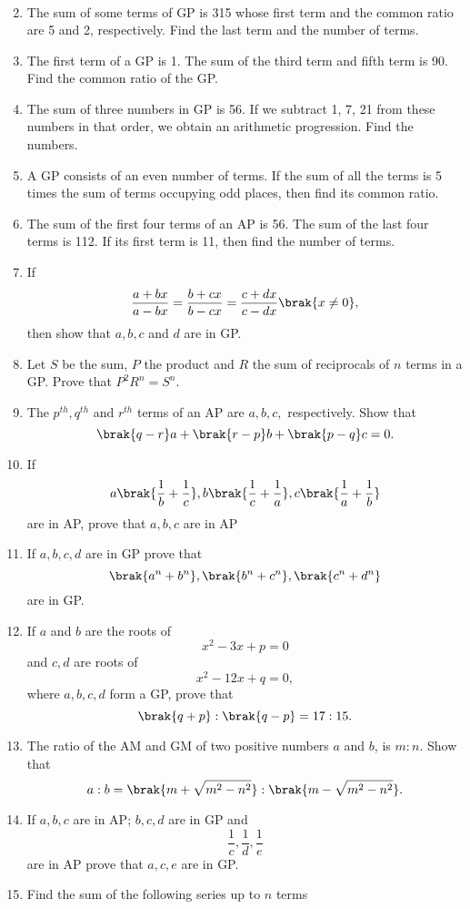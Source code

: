 \begin{enumerate}[label=\thesubsection.\arabic*.,ref=\thesubsection.\theenumi]
\begin{align}
\end{align}
\item The sum of some terms of GP  is 315 whose first term and the common ratio are 5 and 2, respectively. Find the last term and the number of terms.
\item  The first term of a GP  is 1. The sum of the third term and fifth term is 90. Find the common ratio of the GP.
\item The sum of three numbers in GP  is 56. If we subtract 1, 7, 21 from these numbers in that order, we obtain an arithmetic progression. Find the numbers.
\item A GP  consists of an even number of terms. If the sum of all the terms is 5 times the sum of terms occupying odd places, then find its common ratio.
\item  The sum of the first four terms of an AP  is 56. The sum of the last four terms is 112. If its first term is 11, then find the number of terms.
\item If $$\frac{a+bx}{a-bx} = \frac{b+cx}{b-cx} = \frac{c+dx}{c-dx}\brak{x \neq 0},$$ then show that $a, b, c$ and $d$ are in GP.
\item Let $S$ be the sum, $P$ the product and $R$ the sum of reciprocals of $n$ terms in a GP.  Prove that $P^2R^n = S^n.$ 
\item The $p^{th}, q^{th}$ and $r^{th}$ terms of an AP  are $a, b, c,$ respectively. Show that 
$$\brak{q - r }a + \brak{r - p }b + \brak{p - q }c = 0.$$
\item If $$a\brak{\frac{1}{b}+\frac{1}{c}}, b\brak{\frac{1}{c}+\frac{1}{a}}, c\brak{\frac{1}{a}+\frac{1}{b}}$$ are in AP, prove that $a, b, c$ are in AP 
\item If $a, b, c, d$ are in GP  prove that $$\brak{a^n + b^n}, \brak{b^n + c^n}, \brak{c^n + d^n}$$ are in GP. 
\item If $a$ and $b$ are the roots of $$x^2 - 3x + p = 0$$ and $c, d$ are roots of $$x^2 - 12x + q = 0,$$ where $a, b, c, d$ form a GP,  prove that $$\brak{q + p} : \brak{q - p} = 17:15.$$
\item The ratio of the AM  and GM  of two positive numbers $a$ and $b$, is $m : n$. Show that 
$$a:b = \brak{m+\sqrt{m^2 - n^2}}:\brak{m - \sqrt{m^2 - n^2}}.$$
\item If $a, b, c$ are in AP; $b, c, d$ are in GP  and $$\frac{1}{c}, \frac{1}{d}, \frac{1}{e}$$ are in AP  prove that $a, c, e$ are in GP.
\item Find the sum of the following series up to $n$ terms
\begin{enumerate}

\end{enumerate}
\end{enumerate}

